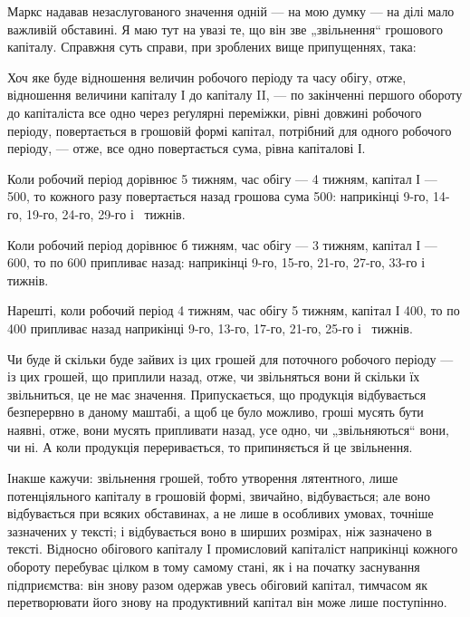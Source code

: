 \parcont{}  %
Маркс надавав незаслугованого значення одній — на мою думку — на ділі
мало важливій обставині. Я маю тут на увазі те, що він зве „звільнення“
грошового капіталу. Справжня суть справи, при зроблених вище припущеннях,
така:

Хоч яке буде відношення величин робочого періоду та часу обігу,
отже, відношення величини капіталу І до капіталу II, — по закінченні першого
обороту до капіталіста все одно через реґулярні переміжки, рівні
довжині робочого періоду, повертається в грошовій формі капітал, потрібний
для одного робочого періоду, — отже, все одно повертається сума,
рівна капіталові І.

Коли робочий період дорівнює 5 тижням, час обігу — 4 тижням, капітал
І — 500, то кожного разу повертається назад грошова
сума 500: наприкінці 9-го, 14-го, 19-го, 24-го, 29-го і~
тижнів.

Коли робочий період дорівнює б тижням, час обігу — 3 тижням, капітал
І — 600, то по 600 припливає назад: наприкінці
9-го, 15-го, 21-го, 27-го, 33-го і~ тижнів.

Нарешті, коли робочий період \deq{} 4 тижням, час обігу \deq{} 5 тижням,
капітал І \deq{} 400, то по 400 припливає назад наприкінці
9-го, 13-го, 17-го, 21-го, 25-го і~ тижнів.

Чи буде й скільки буде зайвих із цих грошей для поточного робочого
періоду — із цих грошей, що приплили назад, отже, чи звільняться
вони й скільки їх звільниться, це не має значення. Припускається, що
продукція відбувається безперервно в даному маштабі, а щоб це було
можливо, гроші мусять бути наявні, отже, вони мусять припливати назад,
усе одно, чи „звільняються“ вони, чи ні. А коли продукція переривається,
то припиняється й це звільнення.

Інакше кажучи: звільнення грошей, тобто утворення лятентного, лише
потенціяльного капіталу в грошовій формі, звичайно, відбувається;
але воно відбувається при всяких обставинах, а не лише в особливих умовах,
точніше зазначених у тексті; і відбувається воно в ширших розмірах,
ніж зазначено в тексті. Відносно обігового капіталу І промисловий капіталіст
наприкінці кожного обороту перебуває цілком в тому самому
стані, як і на початку заснування підприємства: він знову разом одержав
увесь обіговий капітал, тимчасом як перетворювати його знову на продуктивний
капітал він може лише поступінно.

